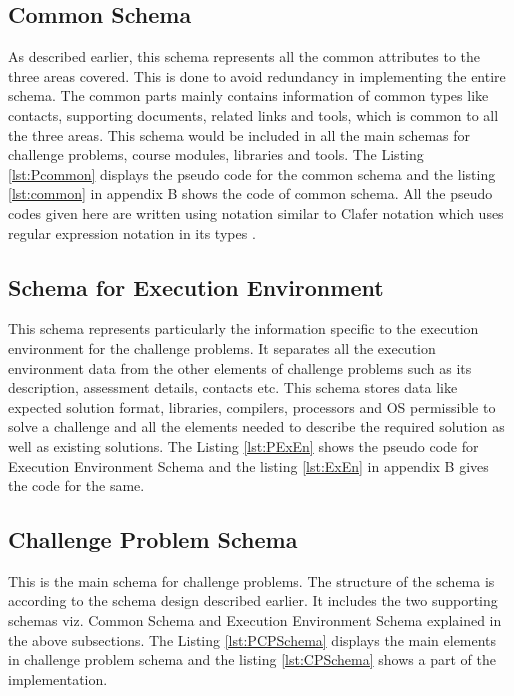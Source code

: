 \documentclass[11pt,letterpaper]{report}
\begin{document}
\subsection{Common Schema}
As described earlier, this schema represents all the common attributes to the three areas covered. This is done to avoid redundancy in implementing the entire schema. The common parts mainly contains information of common types like contacts, supporting documents, related links and tools, which is common to all the three areas. This schema would be included in all the main schemas for challenge problems, course modules, libraries and tools. The Listing \ref{lst:Pcommon} displays the pseudo code for the common schema and the listing \ref{lst:common} in appendix B shows the code of common schema. All the pseudo codes given here are written using notation similar to Clafer notation which uses regular expression notation in its types \cite{Clafer}.    



\subsection{Schema for Execution Environment}
This schema represents particularly the information specific to the execution environment for the challenge problems. It separates all the execution environment data from the other elements of challenge problems such as its description, assessment details, contacts etc. This schema stores data like expected solution format, libraries, compilers, processors and OS permissible to solve a challenge and  all the elements needed to describe the required solution as well as existing solutions. The Listing \ref{lst:PExEn} shows the pseudo code for Execution Environment Schema and the listing \ref{lst:ExEn} in appendix B gives the code for the same.



\subsection{Challenge Problem Schema}
This is the main schema for challenge problems. The structure of the schema is according to the schema design described earlier. It includes the two supporting schemas viz. Common Schema and Execution Environment Schema explained in the above subsections. The Listing \ref{lst:PCPSchema} displays the main elements in challenge problem schema and the listing \ref{lst:CPSchema} shows a part of the implementation.
\end{document}
